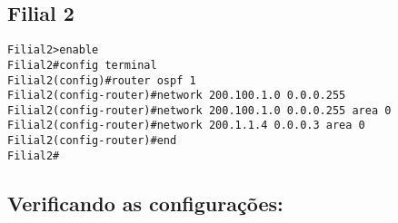 \documentclass[]{article}
\begin{document}
\subsection{Filial 2}\label{filial-2}

\begin{verbatim}
Filial2>enable
Filial2#config terminal
Filial2(config)#router ospf 1
Filial2(config-router)#network 200.100.1.0 0.0.0.255
Filial2(config-router)#network 200.100.1.0 0.0.0.255 area 0
Filial2(config-router)#network 200.1.1.4 0.0.0.3 area 0
Filial2(config-router)#end
Filial2#
\end{verbatim}

\subsection{Verificando as
configurações:}\label{verificando-as-configurauxe7uxf5es}
\end{document}
